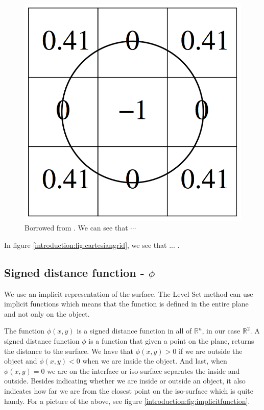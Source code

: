 \begin{figure}[htb]
  \centering
  \includegraphics[scale=0.3]{imgs/cartesiangrid.png}
  \caption{Borrowed from . We can see that $\cdots$}
  \label{introduction:fig:cartesiangrid}
\end{figure}

In figure \vref{introduction:fig:cartesiangrid}, we see that ... .

\subsection{Signed distance function -  $\phi$}



We use an implicit representation of the surface. The Level Set method can use implicit functions which means that the function is defined in the entire plane and not only on the object.

The function $\phi(x,y)$ is a signed distance function in all of
$\mathbb{R}^{n}$, in our case $\mathbb{R}^{2}$. A signed distance
function $\phi$ is a function that given a point on the plane, returns
the distance to the surface. We have that $\phi(x,y) > 0$ if we are
outside the object and $\phi(x,y) < 0$ when we are inside the object.
And last, when $\phi(x,y) = 0$ we are on the interface or 
iso-surface separates the inside and outside.  Besides indicating
whether we are inside or outside an object, it also indicates how far
we are from the closest point on the iso-surface which is quite
handy. For a picture of the above, see figure
\vref{introduction:fig:implicitfunction}.

